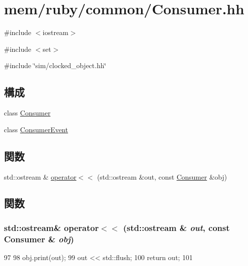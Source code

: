 \hypertarget{Consumer_8hh}{
\section{mem/ruby/common/Consumer.hh}
\label{Consumer_8hh}
}
{\ttfamily \#include $<$iostream$>$}\par
{\ttfamily \#include $<$set$>$}\par
{\ttfamily \#include \char`\"{}sim/clocked\_\-object.hh\char`\"{}}\par
\subsection*{構成}
\begin{DoxyCompactItemize}
\item 
class \hyperlink{classConsumer}{Consumer}
\item 
class \hyperlink{classConsumer_1_1ConsumerEvent}{ConsumerEvent}
\end{DoxyCompactItemize}
\subsection*{関数}
\begin{DoxyCompactItemize}
\item 
std::ostream \& \hyperlink{Consumer_8hh_af20373f36dd7fe89494889c5be3376f8}{operator$<$$<$} (std::ostream \&out, const \hyperlink{classConsumer}{Consumer} \&obj)
\end{DoxyCompactItemize}


\subsection{関数}
\hypertarget{Consumer_8hh_af20373f36dd7fe89494889c5be3376f8}{
\subsubsection[{operator$<$$<$}]{\setlength{\rightskip}{0pt plus 5cm}std::ostream\& operator$<$$<$ (std::ostream \& {\em out}, \/  const {\bf Consumer} \& {\em obj})}}
\label{Consumer_8hh_af20373f36dd7fe89494889c5be3376f8}



\begin{DoxyCode}
97 {
98     obj.print(out);
99     out << std::flush;
100     return out;
101 }
\end{DoxyCode}

